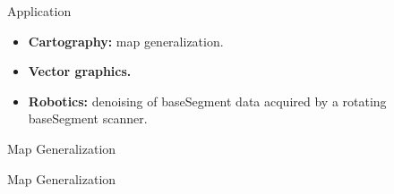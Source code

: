 \documentclass[10pt]{beamer}
\begin{document}
\begin{frame}{Application}
	\begin{itemize}
		\item \textbf{Cartography:} map generalization.
		\item \textbf{Vector graphics.}
		\item \textbf{Robotics:} denoising of baseSegment data acquired by a rotating baseSegment scanner.
	\end{itemize}
\end{frame}

\begin{frame}{Map Generalization}
	\begin{figure}[h]
	\end{figure}
\end{frame}

\begin{frame}{Map Generalization}
	\begin{figure}[h]
		\end{figure}
\end{frame}
\end{document}
